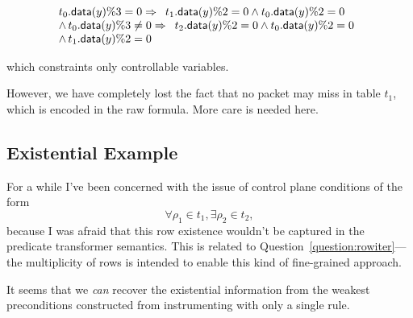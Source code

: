 \documentclass{article}
\newcommand{\ActionDataRow}{\mathsf{data}}
\begin{document}
\[
\begin{array}{l}
  \begin{array}[t]{l}
    t_0.\ActionDataRow(y) \% 3 = 0 \Rightarrow
    \begin{array}[t]{l}
      t_1.\ActionDataRow(y) \% 2 = 0 \wedge t_0.\ActionDataRow(y)\% 2 = 0 \\
    \end{array} \\
    \wedge\,t_0.\ActionDataRow(y) \% 3 \neq 0 \Rightarrow
    \begin{array}[t]{l}
      t_2.\ActionDataRow(y) \% 2 = 0 \wedge t_0.\ActionDataRow(y)\% 2 = 0 \\
    \end{array}
  \end{array} \\
  \,\,\,\wedge\, t_1.\ActionDataRow(y) \% 2 = 0 \\
\end{array}
\]

which constraints only controllable variables.

However, we have completely lost the fact that no packet may miss in table
\(t_1\), which is encoded in the raw formula. More care is needed here.


\subsection{Existential Example}

For a while I've been concerned with the issue of control plane conditions of
the form \[\forall \rho_1 \in t_1, \exists \rho_2 \in t_2,\] because I was
afraid that this row existence wouldn't be captured in the predicate transformer
semantics. This is related to Question~\ref{question:rowiter}---the multiplicity
of rows is intended to enable this kind of fine-grained approach.

It seems that we \emph{can} recover the existential information from the weakest
preconditions constructed from instrumenting with only a single rule.
\end{document}
